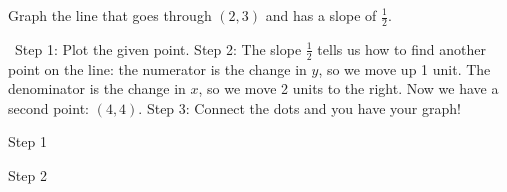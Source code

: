 \begin{boxex}
Graph the line that goes through $(2,3)$ and has a slope of $\frac{1}{2}$.

\exsoln\ Step 1: Plot the given point. Step 2: The slope $\frac{1}{2}$ tells us how to find another point on the line: the numerator is the change in $y$, so we move up 1 unit. The denominator is the change in $x$, so we move 2 units to the right. Now we have a second point: $(4,4)$. Step 3: Connect the dots and you have your graph!

\begin{center}
\begin{minipage}{0.32\textwidth}
	\centering
	Step 1\par\medskip
%
\end{minipage}
%
\begin{minipage}{0.32\textwidth}
	\centering
	Step 2\par\medskip

\end{minipage}
\end{center}
\end{boxex}
